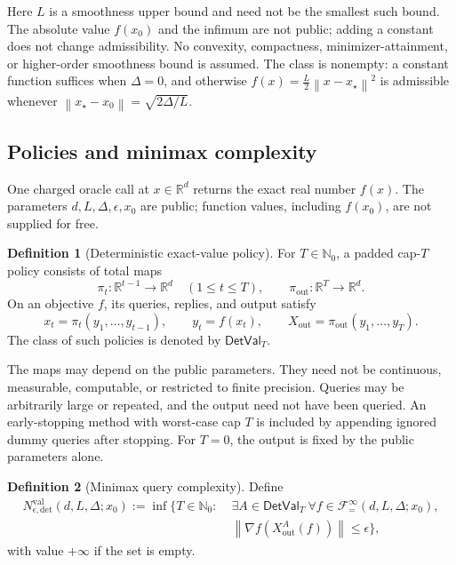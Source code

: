 \documentclass[11pt]{article}
\numberwithin{equation}{section}
\theoremstyle{definition}
\newtheorem{definition}[definition]{Definition}
\theoremstyle{remark}
\newcommand{\R}{\mathbb{R}}
\newcommand{\Nzero}{\mathbb{N}_0}
\newcommand{\norm}[1]{\left\lVert #1\right\rVert}
\newcommand{\Fclass}{\mathcal{F}_{=}^{\infty}}
\newcommand{\DetVal}{\mathsf{DetVal}}
\newcommand{\Nval}{N_{\epsilon,\mathrm{det}}^{\mathrm{val}}}
\begin{document}
Here $L$ is a smoothness upper bound and need not be the smallest such bound. The absolute value $f(x_0)$ and the infimum are
not public; adding a constant does not change admissibility.
No convexity, compactness, minimizer-attainment, or higher-order smoothness
bound is assumed. The class is nonempty: a constant function suffices when
$\Delta=0$, and otherwise
$f(x)=\frac{L}{2}\norm{x-x_\star}^2$ is admissible whenever
$\norm{x_\star-x_0}=\sqrt{2\Delta/L}$.

\subsection{Policies and minimax complexity}

One charged oracle call at $x\in\R^d$ returns the exact real number $f(x)$.
The parameters $d,L,\Delta,\epsilon,x_0$ are public; function values,
including $f(x_0)$, are not supplied for free.

\begin{definition}[Deterministic exact-value policy]
For $T\in\Nzero$, a padded cap-$T$ policy consists of total maps
\[
    \pi_t:\R^{t-1}\longrightarrow\R^d\quad (1\leq t\leq T),
    \qquad
    \pi_{\mathrm{out}}:\R^T\longrightarrow\R^d.
\]
On an objective $f$, its queries, replies, and output satisfy
\begin{equation}
    x_t=\pi_t(y_1,\ldots,y_{t-1}),\qquad y_t=f(x_t),\qquad
    X_{\mathrm{out}}=\pi_{\mathrm{out}}(y_1,\ldots,y_T).
    \label{eq:policy}
\end{equation}
The class of such policies is denoted by $\DetVal_T$.
\end{definition}

The maps may depend on the public parameters. They need not be continuous,
measurable, computable, or restricted to finite precision. Queries may be
arbitrarily large or repeated, and the output need not have been queried.
An early-stopping method with worst-case cap $T$ is included by appending
ignored dummy queries after stopping. For $T=0$, the output is fixed by the
public parameters alone.

\begin{definition}[Minimax query complexity]
Define
\begin{equation}
\begin{split}
\Nval(d,L,\Delta;x_0):=
\inf\bigl\{T\in\Nzero:\;&\exists A\in\DetVal_T\ \forall f\in
\Fclass(d,L,\Delta;x_0),\\
&\norm{\nabla f(X_{\mathrm{out}}^A(f))}\leq\epsilon\bigr\},
\end{split}
\label{eq:complexity}
\end{equation}
with value $+\infty$ if the set is empty.
\end{definition}
\end{document}
